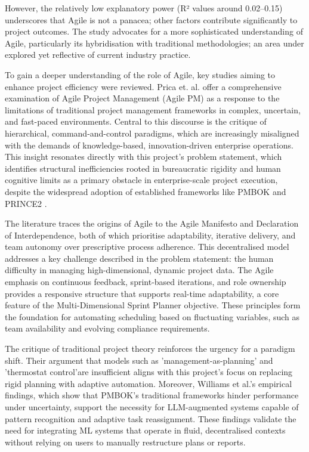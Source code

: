 \documentclass{report}
\begin{document}
However, the relatively low explanatory power (R² values around 0.02–0.15) underscores that Agile is not a panacea; other factors contribute significantly to project outcomes. The study advocates for a more sophisticated understanding of Agile, particularly its hybridisation with traditional methodologies; an area under explored yet reflective of current industry practice.

To gain a deeper understanding of the role of Agile,  key studies aiming to enhance project efficiency were reviewed. Prica et. al. offer a comprehensive examination of Agile Project Management (Agile PM) as a response to the limitations of traditional project management frameworks in complex, uncertain, and fast-paced environments. Central to this discourse is the critique of hierarchical, command-and-control paradigms, which are increasingly misaligned with the demands of knowledge-based, innovation-driven enterprise operations. This insight resonates directly with this project's problem statement, which identifies structural inefficiencies rooted in bureaucratic rigidity and human cognitive limits as a primary obstacle in enterprise-scale project execution, despite the widespread adoption of established frameworks like PMBOK and PRINCE2 \parencite{pricaEnhancingProjectEfficiency2025}.

The literature traces the origins of Agile to the Agile Manifesto and Declaration of Interdependence, both of which prioritise adaptability, iterative delivery, and team autonomy over prescriptive process adherence. This decentralised model addresses a key challenge described in the problem statement: the human difficulty in managing high-dimensional, dynamic project data. The Agile emphasis on continuous feedback, sprint-based iterations, and role ownership provides a responsive structure that supports real-time adaptability, a core feature of the Multi-Dimensional Sprint Planner objective. These principles form the foundation for automating scheduling based on fluctuating variables, such as team availability and evolving compliance requirements.

The critique of traditional project theory reinforces the urgency for a paradigm shift. Their argument that models such as 'management-as-planning' and 'thermostat control'are insufficient aligns with this project's focus on replacing rigid planning with adaptive automation. Moreover, Williams et al.'s empirical findings, which show that PMBOK's traditional frameworks hinder performance under uncertainty, support the necessity for LLM-augmented systems capable of pattern recognition and adaptive task reassignment. These findings validate the need for integrating ML systems that operate in fluid, decentralised contexts without relying on users to manually restructure plans or reports.
\end{document}
